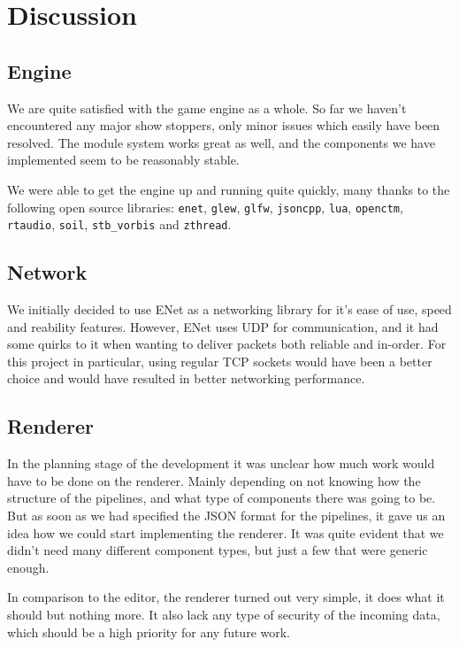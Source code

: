\chapter{Discussion}

\section{Engine}
We are quite satisfied with the game engine as a whole. So far we haven't encountered any major show stoppers, only minor issues which easily have been resolved. The module system works great as well, and the components we have implemented seem to be reasonably stable.

We were able to get the engine up and running quite quickly, many thanks to the following open source libraries: \texttt{enet}, \texttt{glew}, \texttt{glfw}, \texttt{jsoncpp}, \texttt{lua}, \texttt{openctm}, \texttt{rtaudio}, \texttt{soil}, \texttt{stb\_vorbis} and \texttt{zthread}.

\section{Network}
We initially decided to use ENet as a networking library for it's ease of use, speed and reability features. However, ENet uses UDP for communication, and it had some quirks to it when wanting to deliver packets both reliable and in-order. For this project in particular, using regular TCP sockets would have been a better choice and would have resulted in better networking \mbox{performance}.

\section{Renderer}
In the planning stage of the development it was unclear how much work would have to be done on the renderer. Mainly depending on not knowing how the structure of the pipelines, and what type of components there was going to be. But as soon as we had specified the JSON format for the pipelines, it gave us an idea how we could start implementing the renderer. It was quite evident that we didn't need many different component types, but just a few that were generic enough.

In comparison to the editor, the renderer turned out very simple, it does what it should but nothing more. It also lack any type of security of the incoming data, which should be a high priority for any future work.


